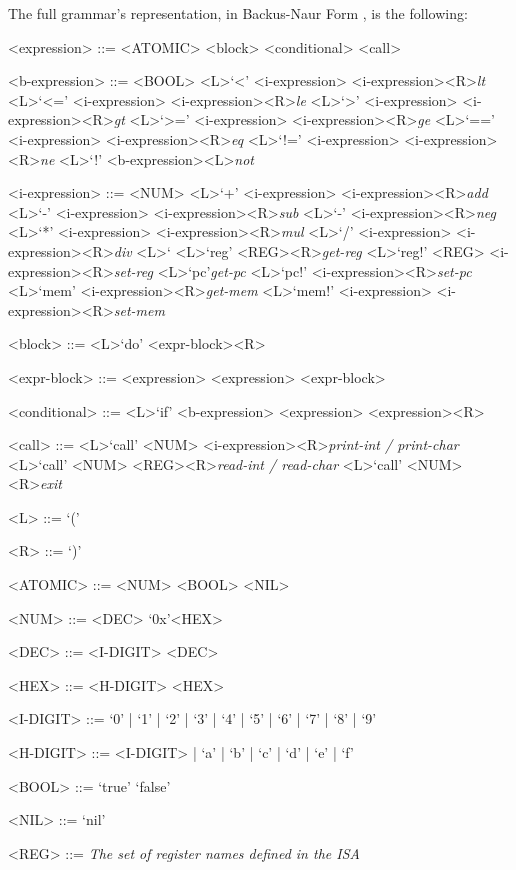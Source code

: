 \noindent
The full grammar's representation, in Backus-Naur Form \parencite{Backus1963Rev}, is the following:
%
\begin{grammar}
  <expression> ::= <ATOMIC>
    \alt <block>
    \alt <conditional>
    \alt <call>

  <b-expression> ::= <BOOL>
    \alt <L>`<' <i-expression> <i-expression><R>\hfill\textit{lt}
    \alt <L>`<=' <i-expression> <i-expression><R>\hfill\textit{le}
    \alt <L>`>' <i-expression> <i-expression><R>\hfill\textit{gt}
    \alt <L>`>=' <i-expression> <i-expression><R>\hfill\textit{ge}
    \alt <L>`==' <i-expression> <i-expression><R>\hfill\textit{eq}
    \alt <L>`!=' <i-expression> <i-expression><R>\hfill\textit{ne}
    \alt <L>`!' <b-expression><L>\hfill\textit{not}

  <i-expression> ::= <NUM>
    \alt <L>`+' <i-expression> <i-expression><R>\hfill\textit{add}
    \alt <L>`-' <i-expression> <i-expression><R>\hfill\textit{sub}
    \alt <L>`-' <i-expression><R>\hfill\textit{neg}
    \alt <L>`*' <i-expression> <i-expression><R>\hfill\textit{mul}
    \alt <L>`/' <i-expression> <i-expression><R>\hfill\textit{div}
    \alt <L>`%
    \alt <L>`reg' <REG><R>\hfill\textit{get-reg}
    \alt <L>`reg!' <REG> <i-expression><R>\hfill\textit{set-reg}
    \alt <L>`pc'\hfill\textit{get-pc}
    \alt <L>`pc!' <i-expression><R>\hfill\textit{set-pc}
    \alt <L>`mem' <i-expression><R>\hfill\textit{get-mem}
    \alt <L>`mem!' <i-expression> <i-expression><R>\hfill\textit{set-mem}

  <block> ::= <L>`do' <expr-block><R>

  <expr-block> ::= <expression>
    \alt <expression> <expr-block>

  <conditional> ::= <L>`if' <b-expression> <expression> <expression><R>

  <call> ::= <L>`call' <NUM> <i-expression><R>\hfill\textit{print-int / print-char}
    \alt <L>`call' <NUM> <REG><R>\hfill\textit{read-int / read-char}
    \alt <L>`call' <NUM><R>\hfill\textit{exit}

  <L> ::= `('

  <R> ::= `)'

  <ATOMIC> ::= <NUM>
    \alt <BOOL>
    \alt <NIL>

  <NUM> ::= <DEC>
    \alt `0x'<HEX>

  <DEC> ::= <I-DIGIT>
    <DEC>

  <HEX> ::= <H-DIGIT>
    <HEX>

  <I-DIGIT> ::= `0' | `1' | `2' | `3' | `4' | `5' | `6' | `7' | `8' | `9'

  <H-DIGIT> ::= <I-DIGIT> | `a' | `b' | `c' | `d' | `e' | `f'

  <BOOL> ::= `true'
    \alt `false'

  <NIL> ::= `nil'

  <REG> ::= \textit{The set of register names defined in the \gls{ISA}}
\end{grammar}



